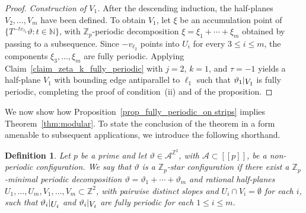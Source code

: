\documentclass[12pt]{amsart}
\numberwithin{equation}{section}
\newtheorem{definition}[theorem]{Definition}
\newcommand{\bb}[1]{\mathbb{#1}}
\newcommand{\sob}[1]{\ensuremath{{\mathbin |}\raise-.4ex\hbox{$#1$}}}
\newcommand{\llb}{[\![}
\newcommand{\rrb}{]\!]}
\begin{document}
\begin{proof}
\textit{Construction of $V_1$.} After the descending induction, the half-planes $V_2, \ldots, V_m$ have been defined. To obtain $V_1 $, let $\xi$ be an accumulation point of $\{T^{-t v_{\pmb{\ell}_2}}\vartheta : t \in \bb{N}\}$, with $\bb{Z}_p$-periodic decomposition $\xi = \xi_1+\cdots+\xi_m$ obtained by passing to a subsequence. Since $- v_{\pmb{\ell}_2}$ points into $U_i$ for every $3 \leq i \leq m$, the components $\xi_3, \ldots, \xi_m$ are fully periodic. Applying Claim~\ref{claim_zeta_k_fully_periodic} with $j=2$, $k=1$, and $\tau = -1$ yields a half-plane $V_1$ with bounding edge antiparallel to $\pmb{\ell}_{1}$ such that $\vartheta_{1}\sob{V_1}$ is fully periodic, completing the proof of condition~(ii) and of the proposition.
\end{proof}

We now show how Proposition~\ref{prop_fully_periodic_on strips} implies Theorem~\ref{thm:modular}. To state the conclusion of the theorem in a form amenable to subsequent applications, we introduce the following shorthand.

\begin{definition}\label{Zp-star definition}
Let $p$ be a prime and let $\vartheta \in \mathcal{A}^{\bb{Z}^2}$, with \(\mathcal{A} \subset \llb p \rrb\), be a non-periodic configuration. We say that $\vartheta$ is a \emph{$\bb{Z}_p$-star configuration} if there exist a $\bb{Z}_p$-minimal periodic decomposition $\vartheta = \vartheta_1+\cdots+\vartheta_m$ and rational half-planes $U_1, \ldots, U_m, V_1, \ldots, V_m \subset \bb{Z}^2$, with pairwise distinct slopes and $U_i \cap V_i = \emptyset$ for each $i$, such that $\vartheta_i\sob{U_i}$ and $\vartheta_i\sob{V_i}$ are fully periodic for each $1 \leq i \leq m$.
\end{definition}
\end{document}
